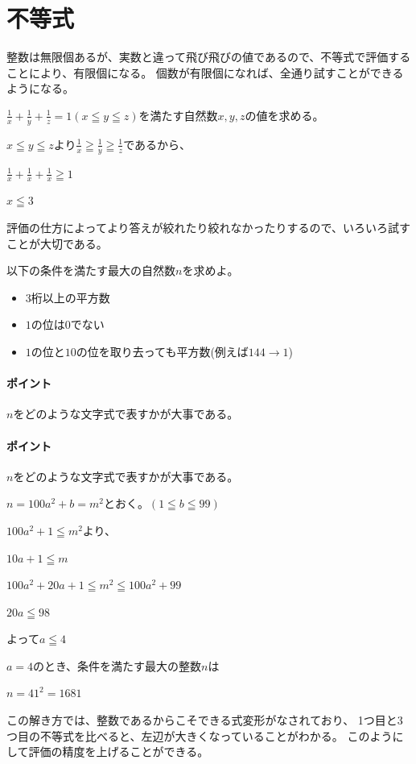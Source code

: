 \documentclass[uplatex,dvipdfmx]{jsbook}
\begin{document}
\section{不等式}
整数は無限個あるが、実数と違って飛び飛びの値であるので、不等式で評価することにより、有限個になる。
個数が有限個になれば、全通り試すことができるようになる。

\begin{problem}[例題]
    $\displaystyle\frac{1}{x}+\frac{1}{y}+\frac{1}{z}=1\left(x\leqq y\leqq z\right)$を満たす自然数$x,y,z$の値を求める。

    $x\leqq y\leqq z$より$\displaystyle\frac{1}{x}\geqq\frac{1}{y}\geqq\frac{1}{z}$であるから、

    $\displaystyle\frac{1}{x}+\frac{1}{x}+\frac{1}{x}\geqq 1$

    $x\leqq 3$
\end{problem}

評価の仕方によってより答えが絞れたり絞れなかったりするので、いろいろ試すことが大切である。

\begin{problem}[練習問題]
    以下の条件を満たす最大の自然数$n$を求めよ。
    \begin{itemize}
        \item $3$桁以上の平方数
        \item $1$の位は$0$でない
        \item $1$の位と$10$の位を取り去っても平方数(例えば$144\rightarrow 1$)
    \end{itemize}
\end{problem}

\paragraph{ポイント}$n$をどのような文字式で表すかが大事である。

\paragraph{ポイント}$n$をどのような文字式で表すかが大事である。

\begin{answer}
    $n=100a^2+b=m^2$とおく。$\left(1\leqq b \leqq 99\right)$

    $100a^2+1 \leqq m^2$より、

    $10a+1 \leqq m$

    $100a^2+20a+1 \leqq m^2 \leqq 100a^2+99$

    $20a \leqq 98$

    よって$a\leqq 4$

    $a=4$のとき、条件を満たす最大の整数$n$は

    $n=41^2=1681$

    この解き方では、整数であるからこそできる式変形がなされており、
    1つ目と3つ目の不等式を比べると、左辺が大きくなっていることがわかる。
    このようにして評価の精度を上げることができる。
\end{answer}
\end{document}
